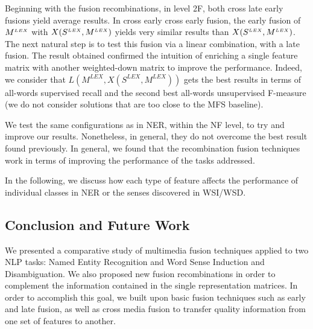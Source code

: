 Beginning with the fusion recombinations, in level 2F, both cross late early fusions yield average results. In cross early cross early fusion, the early fusion of $M^{\scriptscriptstyle LEX}$ with  $X(S^{\scriptscriptstyle LEX}, M^{\scriptscriptstyle LEX})$ yields very similar results than $X(S^{\scriptscriptstyle LEX}, M^{\scriptscriptstyle LEX})$. The next natural step is to test this fusion via a linear combination, with a late fusion. The result obtained confirmed the intuition of enriching a single feature matrix with another weighted-down matrix to improve the performance. Indeed, we consider that $L(M^{LEX}, X(S^{LEX}, M^{LEX}))$ gets the best results in terms of all-words supervised recall and the second best all-words unsupervised F-measure (we do not consider solutions that are too close to the MFS baseline). 

We test the same configurations as in NER, within the NF level, to try and improve our results. Nonetheless, in general, they do not overcome the best result found previously.
In general, we found that the recombination fusion techniques work in terms of improving the performance of the tasks addressed.

In the following, we discuss how each type of feature affects the performance of individual classes in NER or the senses discovered in WSI/WSD.


\subsection{Conclusion and Future Work}
\label{chap6:conclusion}
We presented  a comparative study of multimedia fusion techniques applied to two NLP tasks: Named Entity Recognition and Word Sense Induction and Disambiguation. We also proposed new fusion recombinations in order to complement the information contained in the single representation matrices. In order to accomplish this goal, we built upon basic fusion techniques such as early and late fusion, as well as cross media fusion to transfer quality information from one set of features to another. 

